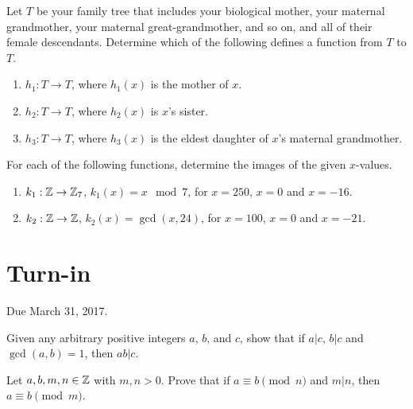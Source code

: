 \documentclass[12pt]{article}
\begin{document}
\begin{qu}
Let $T$ be your family tree that includes your biological mother, your maternal grandmother, your maternal great-grandmother, and so on, and all of their female descendants. Determine which of the following defines a function from $T$ to $T$.
\begin{enumerate}[label=\alph*)]
\item $h_1:T \to T$, where $h_1(x)$ is the mother of $x$.
\item $h_2:T \to T$, where $h_2(x)$ is $x$'s sister.
\item $h_3:T \to T$, where $h_3(x)$ is the eldest daughter of $x$'s maternal grandmother.
\end{enumerate}
\end{qu}

\begin{qu} For each of the following functions, determine the images of the given $x$-values.
\begin{enumerate}[label=\alph*)]
\item $k_1: \mathbb Z \to \mathbb Z_7$, $k_1(x)=x \mod 7$, for $x=250$, $x=0$ and $x=-16$.
\item $k_2: \mathbb Z \to \mathbb Z$, $k_2(x)=\gcd(x, 24)$, for $x=100$, $x=0$ and $x=-21$.
\end{enumerate}
\end{qu}

\newpage
\section{Turn-in} 

Due March 31, 2017.


\begin{qu}
Given any arbitrary positive integers $a$, $b$, and $c$, show that if $a|c$, $b|c$ and $\gcd(a,b)=1$, then $ab|c$.
\end{qu}



\begin{qu}
Let $a, b, m, n \in \mathbb Z$ with $m,n >0$. Prove that if $a\equiv b \pmod{n}$ and $m|n$, then $a\equiv b \pmod{m}$.
\end{qu}
\end{document}

